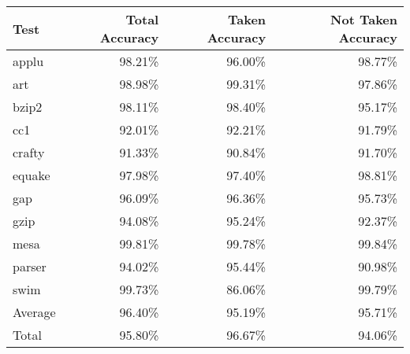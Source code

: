 \begin{tabular}{lrrr}
\hline
Test & Total Accuracy & Taken Accuracy & Not Taken Accuracy \\
\hline
applu & 98.21\% & 96.00\% & 98.77\%  \\
\hline
art & 98.98\% & 99.31\% & 97.86\%  \\
\hline
bzip2 & 98.11\% & 98.40\% & 95.17\%  \\
\hline
cc1 & 92.01\% & 92.21\% & 91.79\%  \\
\hline
crafty & 91.33\% & 90.84\% & 91.70\%  \\
\hline
equake & 97.98\% & 97.40\% & 98.81\%  \\
\hline
gap & 96.09\% & 96.36\% & 95.73\%  \\
\hline
gzip & 94.08\% & 95.24\% & 92.37\%  \\
\hline
mesa & 99.81\% & 99.78\% & 99.84\%  \\
\hline
parser & 94.02\% & 95.44\% & 90.98\%  \\
\hline
swim & 99.73\% & 86.06\% & 99.79\%  \\
\hline
{}Average & 96.40\% & 95.19\% & 95.71\%  \\
\hline
{}Total & 95.80\% & 96.67\% & 94.06\%  \\
\hline
\end{tabular}

